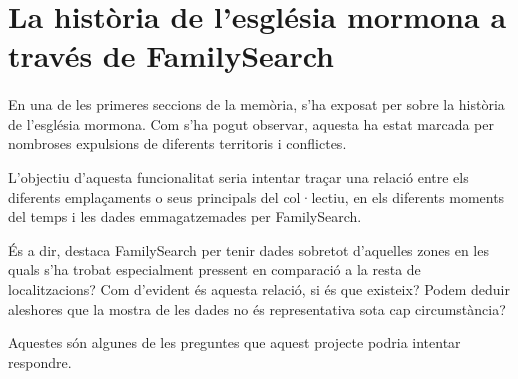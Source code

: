 \section{La història de l'església mormona a través de FamilySearch}

    \paragraph{}
    En una de les primeres seccions de la memòria, s'ha exposat per sobre la història de l'església mormona. Com s'ha pogut observar, aquesta ha estat marcada per nombroses expulsions de diferents territoris i conflictes.

    L'objectiu d'aquesta funcionalitat seria intentar traçar una relació entre els diferents emplaçaments o seus principals del col·lectiu, en els diferents moments del temps i les dades emmagatzemades per FamilySearch.

    És a dir, destaca FamilySearch per tenir dades sobretot d'aquelles zones en les quals s'ha trobat especialment pressent en comparació a la resta de localitzacions? Com d'evident és aquesta relació, si és que existeix? Podem deduir aleshores que la mostra de les dades no és representativa sota cap circumstància?

    Aquestes són algunes de les preguntes que aquest projecte podria intentar respondre.
